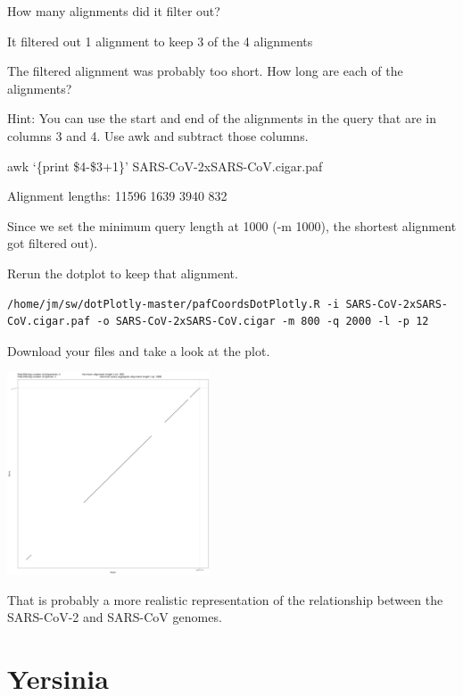 \documentclass[
]{book}
\begin{document}
\hfill\break

How many alignments did it filter out?

It filtered out 1 alignment to keep 3 of the 4 alignments

\hfill\break

The filtered alignment was probably too short. How long are each of the alignments?

Hint: You can use the start and end of the alignments in the query that are in columns 3 and 4. Use awk and subtract those columns.

awk `\{print \$4-\$3+1\}' SARS-CoV-2xSARS-CoV.cigar.paf

Alignment lengths:
11596
1639
3940
832

\hfill\break

Since we set the minimum query length at 1000 (-m 1000), the shortest alignment got filtered out).

Rerun the dotplot to keep that alignment.

\begin{verbatim}
/home/jm/sw/dotPlotly-master/pafCoordsDotPlotly.R -i SARS-CoV-2xSARS-CoV.cigar.paf -o SARS-CoV-2xSARS-CoV.cigar -m 800 -q 2000 -l -p 12
\end{verbatim}

\hfill\break

Download your files and take a look at the plot.

\includegraphics[width=0.45\textwidth,height=\textheight]{./Figures/SARS-CoV-2xSARS-CoV.cigar.png}

That is probably a more realistic representation of the relationship between the SARS-CoV-2 and SARS-CoV genomes.

\hypertarget{yersinia}{%
\section{Yersinia}\label{yersinia}}
\end{document}
